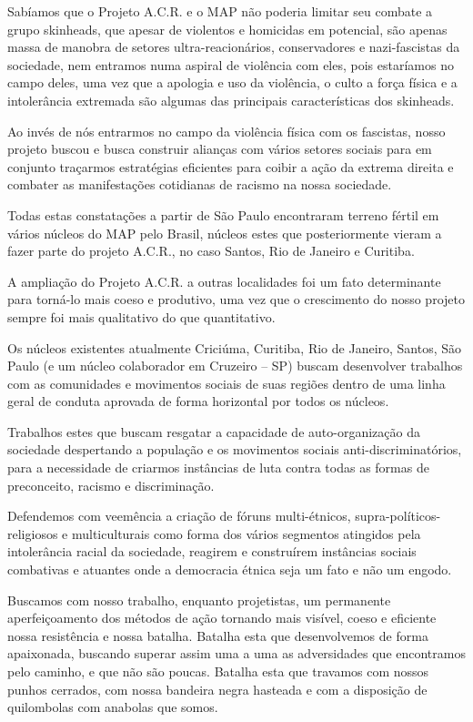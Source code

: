 Sabíamos que o Projeto A.C.R. e o MAP não poderia limitar seu combate a grupo skinheads, que apesar de violentos e homicidas em potencial, são apenas massa de manobra de setores ultra-reacionários, conservadores e nazi-fascistas da sociedade, nem entramos numa aspiral de violência com eles, pois estaríamos no campo deles, uma vez que a apologia e uso da violência, o culto a força física e a intolerância extremada são algumas das principais características dos skinheads.

Ao invés de nós entrarmos no campo da violência física com os fascistas, nosso projeto buscou e busca construir alianças com vários setores sociais para em conjunto traçarmos estratégias eficientes para coibir a ação da extrema direita e combater as manifestações cotidianas de racismo na nossa sociedade.

Todas estas constatações a partir de São Paulo encontraram terreno fértil em vários núcleos do MAP pelo Brasil, núcleos estes que posteriormente vieram a fazer parte do projeto A.C.R., no caso Santos, Rio de Janeiro e Curitiba.

A ampliação do Projeto A.C.R. a outras localidades foi um fato determinante para torná-lo mais coeso e produtivo, uma vez que o crescimento do nosso projeto sempre foi mais qualitativo do que quantitativo.

Os núcleos existentes atualmente Criciúma, Curitiba, Rio de Janeiro, Santos, São Paulo (e um núcleo colaborador em Cruzeiro – SP) buscam desenvolver trabalhos com as comunidades e movimentos sociais de suas regiões dentro de uma linha geral de conduta aprovada de forma horizontal por todos os núcleos.

Trabalhos estes que buscam resgatar a capacidade de auto-organização da sociedade despertando a população e os movimentos sociais anti-discriminatórios, para a necessidade de criarmos instâncias de luta contra todas as formas de preconceito, racismo e discriminação.

Defendemos com veemência a criação de fóruns multi-étnicos, supra-políticos-religiosos e multiculturais como forma dos vários segmentos atingidos pela intolerância racial da sociedade, reagirem e construírem instâncias sociais combativas e atuantes onde a democracia étnica seja um fato e não um engodo.

Buscamos com nosso trabalho, enquanto projetistas, um permanente aperfeiçoamento dos métodos de ação tornando mais visível, coeso e eficiente nossa resistência e nossa batalha.
Batalha esta que desenvolvemos de forma apaixonada, buscando superar assim uma a uma as adversidades que encontramos pelo caminho, e que não são poucas.
Batalha esta que travamos com nossos punhos cerrados, com nossa bandeira negra hasteada e com a disposição de quilombolas com anabolas que somos.

